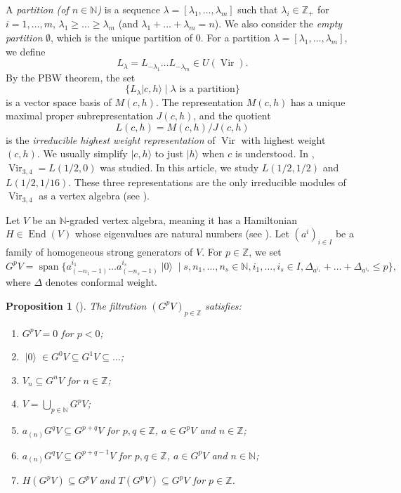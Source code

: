 \documentclass[a4paper, 12pt, reqno]{amsart}
\newtheorem{proposition}[theorem]{Proposition}
\theoremstyle{remark}
\DeclareMathOperator{\Vir}{Vir}
\DeclareMathOperator{\End}{End}
\DeclareMathOperator{\vspan}{span}
\DeclareMathOperator{\vac}{|0\rangle}
\begin{document}
A \emph{partition (of $n \in \mathbb{N}$)} is a sequence $\lambda = [\lambda_1, \dots, \lambda_m]$ such that $\lambda_i \in \mathbb{Z}_+$ for $i = 1, \dots, m$, $\lambda_1 \ge \dots \ge \lambda_m$ (and $\lambda_1 + \dots + \lambda_m = n$).
We also consider the \emph{empty partition} $\emptyset$, which is the unique partition of $0$.
For a partition $\lambda = [\lambda_1, \dots, \lambda_m]$, we define
\begin{equation*}
  L_{\lambda} = L_{-\lambda_1}\dots L_{-\lambda_m} \in U(\Vir).
\end{equation*}
By the PBW theorem, the set
\begin{equation*}
  \{L_{\lambda}|c, h\rangle \mid \text{$\lambda$ is a partition}\}
\end{equation*}
is a vector space basis of $M(c, h)$.
The representation $M(c, h)$ has a unique maximal proper subrepresentation $J(c, h)$, and the quotient
\begin{equation*}
  L(c, h) = M(c, h)/J(c, h)
\end{equation*}
is the \emph{irreducible highest weight representation} of $\Vir$ with highest weight $(c, h)$.
We usually simplify $|c, h\rangle$ to just $|h\rangle$ when $c$ is understood.
In \cite{andrews_singular_2022}, $\Vir_{3, 4} = L(1/2, 0)$ was studied.
In this article, we study $L(1/2, 1/2)$ and $L(1/2, 1/16)$.
These three representations are the only irreducible modules of $\Vir_{3, 4}$ as a vertex algebra (see \cite[Theorem 4.2]{wang_rationality_1993}).

Let $V$ be an $\mathbb{N}$-graded vertex algebra, meaning it has a Hamiltonian $H \in \End(V)$ whose eigenvalues are natural numbers (see \cite[\S1.6]{de_sole_finite_2006}).
Let $(a^i)_{i \in I}$ be a family of homogeneous strong generators of $V$.
For $p \in \mathbb{Z}$, we set
\begin{equation*}
  G^pV = \vspan\{a^{i_1}_{(-n_1 - 1)}\dots a^{i_s}_{(-n_s - 1)}\vac \mid s, n_1, \dots, n_s \in \mathbb{N}, i_1, \dots, i_s \in I, \Delta_{a^{i_1}} + \dots + \Delta_{a^{i_s}} \le p\},
\end{equation*}
where $\Delta$ denotes conformal weight.

\begin{proposition}[{\cite{li_vertex_2004}}]
  \label{prp:1}
  The filtration $(G^pV)_{p \in \mathbb{Z}}$ satisfies:
  \begin{enumerate}
  \item $G^pV = 0$ for $p < 0$;
  \item $\vac \in G^0V \subseteq G^1V \subseteq \dots$;
  \item $V_n \subseteq G^nV$ for $n \in \mathbb{Z}$;
  \item $V = \bigcup_{p \in \mathbb{N}}G^pV$;
  \item $a_{(n)}G^qV \subseteq G^{p + q}V$ for $p, q \in \mathbb{Z}$, $a \in G^pV$ and $n \in \mathbb{Z}$;
  \item $a_{(n)}G^qV \subseteq G^{p + q - 1}V$ for $p, q \in \mathbb{Z}$, $a \in G^pV$ and $n \in \mathbb{N}$;
  \item $H(G^pV) \subseteq G^pV$ and $T(G^pV) \subseteq G^pV$ for $p \in \mathbb{Z}$.
  \end{enumerate}
\end{proposition}
\end{document}
